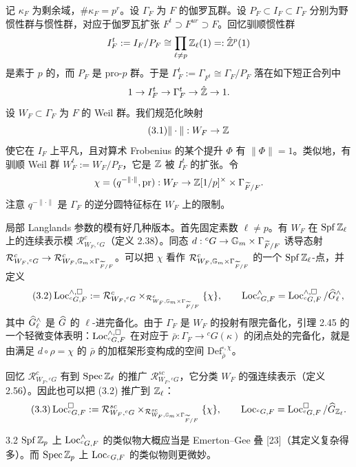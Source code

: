 记 $\kappa_F$ 为剩余域，$\#\kappa_F=p^r$。设 $\Gamma_F$ 为 $F$ 的伽罗瓦群。设 $P_F\subset I_F\subset\Gamma_F$ 分别为野惯性群与惯性群，对应于伽罗瓦扩张 $F^t\supset F^{ur}\supset F$。回忆驯顺惯性群
\[
I^t_F:=I_F/P_F\cong\prod_{\ell\neq p}\mathbb{Z}_\ell(1)=:\hat{\mathbb{Z}}^p(1)
\]
是素于 $p$ 的，而 $P_F$ 是 pro-$p$ 群。于是 $\Gamma^t_F:=\Gamma_{F^t}\cong\Gamma_F/P_F$ 落在如下短正合列中
\[
1\to I^t_F\to\Gamma^t_F\to\hat{\mathbb{Z}}\to1.
\]
设 $W_F\subset\Gamma_F$ 为 $F$ 的 Weil 群。我们规范化映射
\begin{equation*}\tag{3.1}
\|\cdot\|:W_F\to\mathbb{Z}
\end{equation*}
使它在 $I_F$ 上平凡，且对算术 Frobenius 的某个提升 $\Phi$ 有 $\|\Phi\|=1$。类似地，有驯顺 Weil 群 $W^t_F:=W_F/P_F$，它是 $\mathbb{Z}$ 被 $I^t_F$ 的扩张。令
\[
\chi=(q^{-\|\cdot\|},\mathrm{pr}):W_F\to\mathbb{Z}[1/p]^\times\times\Gamma_{\widetilde F/F}.
\]
注意 $q^{-\|\cdot\|}$ 是 $\Gamma_F$ 的逆分圆特征标在 $W_F$ 上的限制。

局部 Langlands 参数的模有好几种版本。首先固定素数 $\ell\neq p$。有 $W_F$ 在 $\operatorname{Spf}\mathbb{Z}_\ell$ 上的连续表示模 $\mathcal R^c_{W_F,{}^cG}$（定义 2.38）。同态 $d:{}^cG\to\mathbb G_m\times\Gamma_{\widetilde F/F}$ 诱导态射 $\mathcal R^c_{W_F,{}^cG}\to\mathcal R^c_{W_F,\mathbb G_m\times\Gamma_{\widetilde F/F}}$。可以把 $\chi$ 看作 $\mathcal R^c_{W_F,\mathbb G_m\times\Gamma_{\widetilde F/F}}$ 的一个 $\operatorname{Spf}\mathbb{Z}_\ell$-点，并定义
\begin{equation*}\tag{3.2}
\operatorname{Loc}^{\wedge,\square}_{{}^cG,F}:=\mathcal R^c_{W_F,{}^cG}\times_{\mathcal R^c_{W_F,\mathbb G_m\times\Gamma_{\widetilde F/F}}}\{\chi\},\qquad
\operatorname{Loc}^{\wedge}_{{}^cG,F}=\operatorname{Loc}^{\wedge,\square}_{{}^cG,F}/\widehat{G}^{\wedge}_\ell,
\end{equation*}
其中 $\widehat{G}^{\wedge}_\ell$ 是 $\widehat{G}$ 的 $\ell$-进完备化。由于 $\Gamma_F$ 是 $W_F$ 的投射有限完备化，引理 2.45 的一个轻微变体表明：$\operatorname{Loc}^{\wedge,\square}_{{}^cG,F}$ 在对应于 $\bar\rho:\Gamma_F\to{}^cG(\kappa)$ 的闭点处的完备化，就是由满足 $d\circ\rho=\chi$ 的 $\bar\rho$ 的加框架形变构成的空间 $\mathrm{Def}^{\square,\chi}_{\bar\rho}$。

回忆 $\mathcal R^c_{W_F,{}^cG}$ 有到 $\operatorname{Spec}\mathbb{Z}_\ell$ 的推广 $\mathcal R^{sc}_{W_F,{}^cG}$，它分类 $W_F$ 的强连续表示（定义 2.56）。因此也可以把 (3.2) 推广到 $\mathbb{Z}_\ell$：
\begin{equation*}\tag{3.3}
\operatorname{Loc}^{\square}_{{}^cG,F}:=\mathcal R^{sc}_{W_F,{}^cG}\times_{\mathcal R^{sc}_{W_F,\mathbb G_m\times\Gamma_{\widetilde F/F}}}\{\chi\},\qquad
\operatorname{Loc}_{{}^cG,F}=\operatorname{Loc}^{\square}_{{}^cG,F}/\widehat{G}_{\mathbb{Z}_\ell}.
\end{equation*}

\begin{rem}{3.2}
$\operatorname{Spf}\mathbb{Z}_p$ 上 $\operatorname{Loc}^{\wedge}_{{}^cG,F}$ 的类似物大概应当是 Emerton–Gee 叠 [23]（其定义复杂得多）。而 $\operatorname{Spec}\mathbb{Z}_p$ 上 $\operatorname{Loc}_{{}^cG,F}$ 的类似物则更微妙。
\end{rem}

